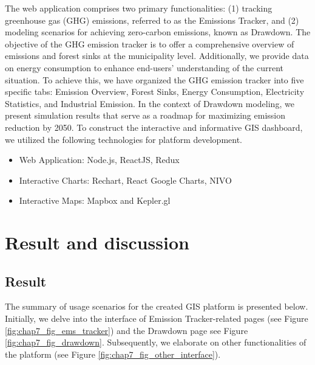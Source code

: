 The web application comprises two primary functionalities: (1) tracking greenhouse gas (GHG) emissions, referred to as the Emissions Tracker, and (2) modeling scenarios for achieving zero-carbon emissions, known as Drawdown. The objective of the GHG emission tracker is to offer a comprehensive overview of emissions and forest sinks at the municipality level. Additionally, we provide data on energy consumption to enhance end-users' understanding of the current situation. To achieve this, we have organized the GHG emission tracker into five specific tabs: Emission Overview, Forest Sinks, Energy Consumption, Electricity Statistics, and Industrial Emission. In the context of Drawdown modeling, we present simulation results that serve as a roadmap for maximizing emission reduction by 2050. To construct the interactive and informative GIS dashboard, we utilized the following technologies for platform development. \par
\begin{itemize}
  \item Web Application: Node.js, ReactJS, Redux
  \item Interactive Charts: Rechart, React Google Charts, NIVO
  \item Interactive Maps: Mapbox and Kepler.gl
\end{itemize}

\section{Result and discussion}
\subsection{Result}
The summary of usage scenarios for the created GIS platform is presented below. Initially, we delve into the interface of Emission Tracker-related pages (see Figure \ref{fig:chap7_fig_ems_tracker}) and the Drawdown page {see Figure \ref{fig:chap7_fig_drawdown}}. Subsequently, we elaborate on other functionalities of the platform (see Figure \ref{fig:chap7_fig_other_interface}). \par


